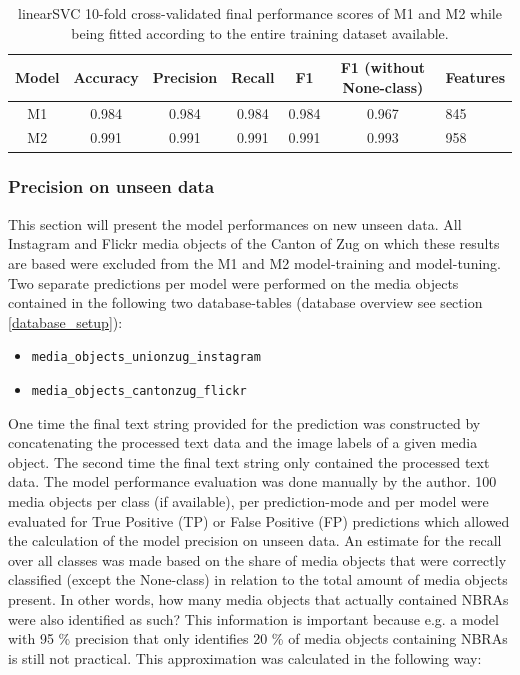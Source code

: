\begin{table}[h]
\begin{center}
\caption{linearSVC 10-fold cross-validated final performance scores of M1 and M2 while being fitted according to the entire training dataset available.}\vspace{1ex}
\label{tab:m1_m2_linearSVC_final_scores}
\begin{tabular}{cccccc}\hline
Model & Accuracy & Precision & Recall & F1 & F1 (without None-class) & Features\\ \hline
M1 & 0.984 & 0.984 & 0.984 & 0.984 & 0.967 & 845\\
M2 & 0.991 & 0.991 & 0.991 & 0.991 & 0.993 & 958\\ \hline
\end{tabular}
\end{center}
\end{table}

\subsubsection{Precision on unseen data} \label{precision_unseen_data}
This section will present the model performances on new unseen data. All Instagram and Flickr media objects of the Canton of Zug on which these results are based were excluded from the M1 and M2 model-training and model-tuning. Two separate predictions per model were performed on the media objects contained in the following two database-tables (database overview see section \ref{database_setup}):

\begin{itemize}
    \item \texttt{media\_objects\_unionzug\_instagram} \item \texttt{media\_objects\_cantonzug\_flickr}
\end{itemize}

One time the final text string provided for the prediction was constructed by concatenating the processed text data and the image labels of a given media object. The second time the final text string only contained the processed text data. The model performance evaluation was done manually by the author. 100 media objects per class (if available), per prediction-mode and per model were evaluated for True Positive (TP) or False Positive (FP) predictions which allowed the calculation of the model precision on unseen data. An estimate for the recall over all classes was made based on the share of media objects that were correctly classified (except the None-class) in relation to the total amount of media objects present. In other words, how many media objects that actually contained NBRAs were also identified as such? This information is important because e.g. a model with 95 \% precision that only identifies 20 \% of media objects containing NBRAs is still not practical. This approximation was calculated in the following way:

